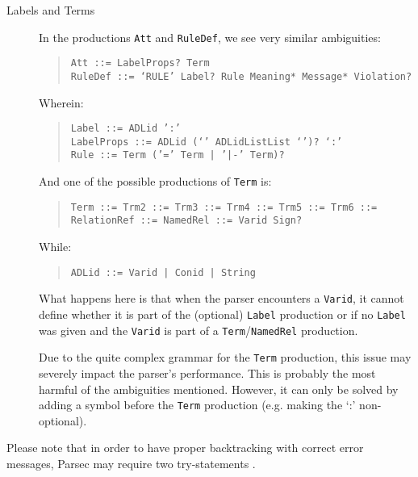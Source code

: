 \begin{description}
  \item[Labels and Terms]
    In the productions \texttt{Att} and \texttt{RuleDef}, we see very similar ambiguities:
    \begin{quote}
        \texttt{Att ::= LabelProps? Term}\\
        \texttt{RuleDef ::= `RULE' Label? Rule Meaning* Message* Violation?}
    \end{quote}
    Wherein:
    \begin{quote}
        \texttt{Label ::= ADLid ':'}\\
        \texttt{LabelProps ::= ADLid (`{' ADLidListList `}')? `:'}\\
        \texttt{Rule ::= Term ('=' Term | '|-' Term)?}
    \end{quote}
    And one of the possible productions of \texttt{Term} is:
    \begin{quote}
        \texttt{Term ::= Trm2 ::= Trm3 ::= Trm4 ::= Trm5 ::= Trm6 ::= RelationRef ::= NamedRel ::= Varid Sign?}
    \end{quote}
    While:
    \begin{quote}
        \texttt{ADLid ::= Varid | Conid | String}
    \end{quote}
    
    What happens here is that when the parser encounters a \texttt{Varid}, it cannot define whether it is part of the (optional) \texttt{Label} production or if no \texttt{Label} was given and the \texttt{Varid} is part of a \texttt{Term}/\texttt{NamedRel} production.
    
    Due to the quite complex grammar for the \texttt{Term} production, this issue may severely impact the parser's performance.
    This is probably the most harmful of the ambiguities mentioned.
    However, it can only be solved by adding a symbol before the \texttt{Term} production (e.g. making the `:' non-optional).
\end{description}
%
Please note that in order to have proper backtracking with correct error messages, Parsec may require two try-statements .
